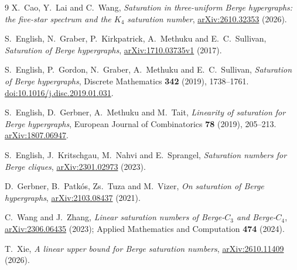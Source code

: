 \documentclass[11pt]{article}
\theoremstyle{remark}
\begin{document}
\begin{thebibliography}{9}
X.~Cao, Y.~Lai and C.~Wang, \emph{Saturation in three-uniform Berge
hypergraphs: the five-star spectrum and the $K_4$ saturation number},
\href{https://arxiv.org/abs/2610.32353}{arXiv:2610.32353} (2026).

S.~English, N.~Graber, P.~Kirkpatrick, A.~Methuku and E.~C.~Sullivan,
\emph{Saturation of Berge hypergraphs},
\href{https://arxiv.org/abs/1710.03735v1}{arXiv:1710.03735v1} (2017).

S.~English, P.~Gordon, N.~Graber, A.~Methuku and E.~C.~Sullivan,
\emph{Saturation of Berge hypergraphs}, Discrete Mathematics
\textbf{342} (2019), 1738--1761.
\href{https://doi.org/10.1016/j.disc.2019.01.031}{doi:10.1016/j.disc.2019.01.031}.

S.~English, D.~Gerbner, A.~Methuku and M.~Tait,
\emph{Linearity of saturation for Berge hypergraphs}, European Journal of
Combinatorics \textbf{78} (2019), 205--213.
\href{https://arxiv.org/abs/1807.06947}{arXiv:1807.06947}.

S.~English, J.~Kritschgau, M.~Nahvi and E.~Sprangel, \emph{Saturation
numbers for Berge cliques},
\href{https://arxiv.org/abs/2301.02973}{arXiv:2301.02973} (2023).

D.~Gerbner, B.~Patk\'os, Zs.~Tuza and M.~Vizer, \emph{On saturation of
Berge hypergraphs}, \href{https://arxiv.org/abs/2103.08437}{arXiv:2103.08437}
(2021).

C.~Wang and J.~Zhang, \emph{Linear saturation numbers of Berge-$C_3$ and
Berge-$C_4$}, \href{https://arxiv.org/abs/2306.06435}{arXiv:2306.06435}
(2023); Applied Mathematics and Computation \textbf{474} (2024).

T.~Xie, \emph{A linear upper bound for Berge saturation numbers},
\href{https://arxiv.org/abs/2610.11409}{arXiv:2610.11409} (2026).
\end{thebibliography}
\end{document}
